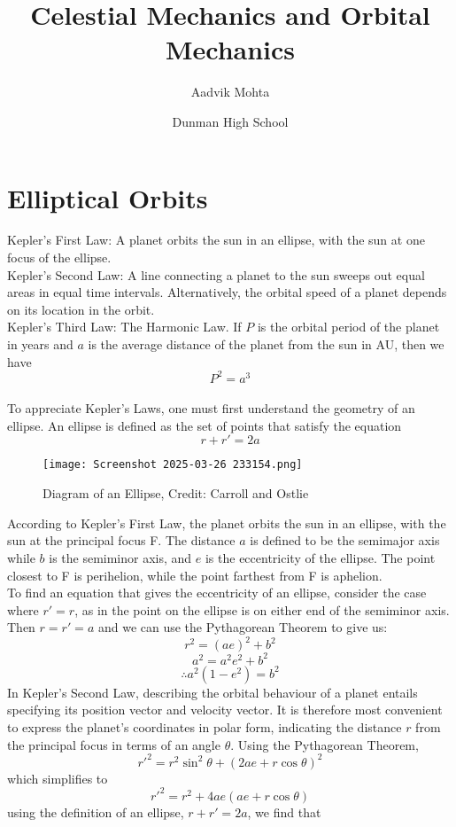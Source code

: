 \documentclass{article}
\title{ Celestial Mechanics and Orbital Mechanics}
\author{Aadvik Mohta}
\date{Dunman High School}
\begin{document}
\maketitle

\section{Elliptical Orbits}
Kepler's First Law: A planet orbits the sun in an ellipse, with the sun at one focus of the ellipse.
\\
Kepler's Second Law: A line connecting a planet to the sun sweeps out equal areas in equal time intervals. Alternatively, the orbital speed of a planet depends on its location in the orbit.
\\
Kepler's Third Law: The Harmonic Law. If $P$ is the orbital period of the planet in years and $a$ is the average distance of the planet from the sun in AU, then we have $$P^2=a^3$$
\\
To appreciate Kepler's Laws, one must first understand the geometry of an ellipse. An ellipse is defined as the set of points that satisfy the equation $$r+r'=2a$$
\begin{figure}
    \centering
    \texttt{[image: Screenshot 2025-03-26 233154.png]}
    \caption{Diagram of an Ellipse, Credit: Carroll and Ostlie}
    \label{fig:1}
\end{figure}
According to Kepler's First Law, the planet orbits the sun in an ellipse, with the sun at the principal focus F. The distance $a$ is defined to be the semimajor axis while $b$ is the semiminor axis, and $e$ is the eccentricity of the ellipse. The point closest to F is perihelion, while the point farthest from F is aphelion.
\\
To find an equation that gives the eccentricity of an ellipse, consider the case where $r'=r$, as in the point on the ellipse is on either end of the semiminor axis. Then $r=r'=a$ and we can use the Pythagorean Theorem to give us:
$$r^2=(ae)^2+b^2$$
$$a^2=a^2e^2+b^2$$
$$\therefore a^2(1-e^2)=b^2$$
In Kepler's Second Law, describing the orbital behaviour of a planet entails specifying its position vector and velocity vector. It is therefore most convenient to express the planet's coordinates in polar form, indicating the distance $r$ from the principal focus in terms of an angle $\theta$. Using the Pythagorean Theorem,
$$r'^2=r^2\sin^2{\theta}+(2ae+r\cos\theta)^2 $$
which simplifies to 
$$r'^2=r^2+4ae(ae+r\cos\theta)$$
using the definition of an ellipse, $r+r'=2a$, we find that
\end{document}
